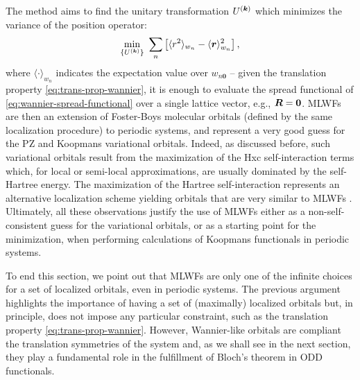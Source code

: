 The method aims to find the unitary transformation $U^{({\bm k})}$ which minimizes the variance of the position operator:
%
\begin{equation}
    \min_{\{ U^{({\bm k})} \}} \ \sum_n \left[ \langle r^2 \rangle_{w_n} - \langle {\bm r} \rangle_{w_n}^2 \right] ,
    \label{eq:wannier-spread-functional}
\end{equation}
%
where $\langle \cdot \rangle_{w_n}$ indicates the expectation value over $w_{n{\bm 0}}$ -- given the translation property \eqref{eq:trans-prop-wannier}, it is enough to evaluate the spread functional of \cref{eq:wannier-spread-functional} over a single lattice vector, e.g., ${\bm R} = \bm 0$. MLWFs are then an extension of Foster-Boys molecular orbitals (defined by the same localization procedure) \cite{boys_construction_1960,foster_canonical_1960} to periodic systems, and represent a very good guess for the PZ and Koopmans variational orbitals. Indeed, as discussed before, such variational orbitals result from the maximization of the Hxc self-interaction terms which, for local or semi-local approximations, are usually dominated by the self-Hartree energy. The maximization of the Hartree self-interaction represents an alternative localization scheme yielding orbitals that are very similar to MLWFs \cite{marzari_maximally_2012}. Ultimately, all these observations justify the use of MLWFs either as a non-self-consistent guess for the variational orbitals, or as a starting point for the minimization, when performing calculations of Koopmans functionals in periodic systems.

To end this section, we point out that MLWFs are only one of the infinite choices for a set of localized orbitals, even in periodic systems. The previous argument highlights the importance of having a set of (maximally) localized orbitals but, in principle, does not impose any particular constraint, such as the translation property \eqref{eq:trans-prop-wannier}. However, Wannier-like orbitals are compliant the translation symmetries of the system and, as we shall see in the next section, they play a fundamental role in the fulfillment of Bloch's theorem in ODD functionals.

